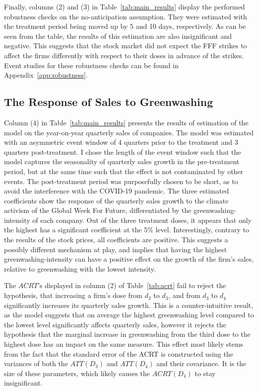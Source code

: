 \documentclass[12pt]{article}
\begin{document}
Finally, columns (2) and (3) in Table~\ref{tab:main_results} display the performed robustness checks on the no-anticipation assumption. They were estimated with the treatment period being moved up by 5 and 10 days, respectively. As can be seen from the table, the results of this estimation are also insignificant and negative. This suggests that the stock market did not expect the FFF strikes to affect the firms differently with respect to their doses in advance of the strikes. Event studies for these robustness checks can be found in Appendix~\ref{app:robustness}.





\subsection{The Response of Sales to Greenwashing}

Column (4) in Table~\ref{tab:main_results} presents the results of estimation of the model on the year-on-year quarterly sales of companies. The model was estimated with an asymmetric event window of 4 quarters prior to the treatment and 3 quarters post-treatment. I chose the length of the event window such that the model captures the seasonality of quarterly sales growth in the pre-treatment period, but at the same time such that the effect is not contaminated by other events. The post-treatment period was purposefully chosen to be short, as to avoid the interference with the COVID-19 pandemic. The three estimated coefficients show the response of the quarterly sales growth to the climate activism of the Global Week For Future, differentiated by the greenwashing-intensity of each company. Out of the three treatment doses, it appears that only the highest has a significant coefficient at the 5\% level. Interestingly, contrary to the results of the stock prices, all coefficients are positive. This suggests a possibly different mechanism at play, and implies that having the highest greenwashing-intensity can have a positive effect on the growth of the firm's sales, relative to greenwashing with the lowest intensity.

The $ACRT$'s displayed in column (2) of Table~\ref{tab:acrt} fail to reject the hypothesis, that increasing a firm's dose from $d_2$ to $d_3$, and from $d_3$ to $d_4$ significantly increases its quarterly sales growth. This is a counter-intuitive result, as the model suggests that on average the highest greenwashing level compared to the lowest level significantly affects quarterly sales, however it rejects the hypothesis that the marginal increase in greenwashing from the third dose to the highest dose has an impact on the same measure. This effect most likely stems from the fact that the standard error of the ACRT is constructed using the variances of both the $ATT(D_3)$ and $ATT(D_4)$ and their covariance. It is the size of these parameters, which likely causes the $ACRT(D_4)$ to stay insignificant.
\end{document}
